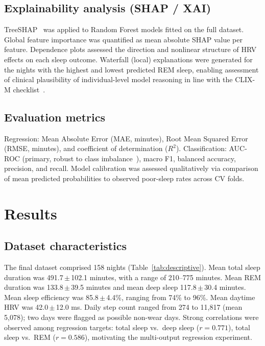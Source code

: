 \documentclass[fleqn,10pt]{wlscirep}
\begin{document}
\subsection*{Explainability analysis (SHAP / XAI)}
TreeSHAP~\cite{lundberg2017} was applied to Random Forest models fitted on the full dataset. Global feature importance was quantified as mean absolute SHAP value per feature. Dependence plots assessed the direction and nonlinear structure of HRV effects on each sleep outcome. Waterfall (local) explanations were generated for the nights with the highest and lowest predicted REM sleep, enabling assessment of clinical plausibility of individual-level model reasoning in line with the CLIX-M checklist~\cite{clixm}.

\subsection*{Evaluation metrics}
Regression: Mean Absolute Error (MAE, minutes), Root Mean Squared Error (RMSE, minutes), and coefficient of determination ($R^2$). Classification: AUC-ROC (primary, robust to class imbalance~\cite{tripodai}), macro F1, balanced accuracy, precision, and recall. Model calibration was assessed qualitatively via comparison of mean predicted probabilities to observed poor-sleep rates across CV folds.

\section*{Results}

\subsection*{Dataset characteristics}
\noindent The final dataset comprised 158 nights (Table~\ref{tab:descriptive}). Mean total sleep duration was 491.7\,$\pm$\,102.1 minutes, with a range of 210--775 minutes. Mean REM duration was 133.8\,$\pm$\,39.5 minutes and mean deep sleep 117.8\,$\pm$\,30.4 minutes. Mean sleep efficiency was 85.8\,$\pm$\,4.4\%, ranging from 74\% to 96\%. Mean daytime HRV was 42.0\,$\pm$\,12.0 ms. Daily step count ranged from 274 to 11,817 (mean 5,078); two days were flagged as possible non-wear days. Strong correlations were observed among regression targets: total sleep vs.\ deep sleep ($r = 0.771$), total sleep vs.\ REM ($r = 0.586$), motivating the multi-output regression experiment.
\end{document}
